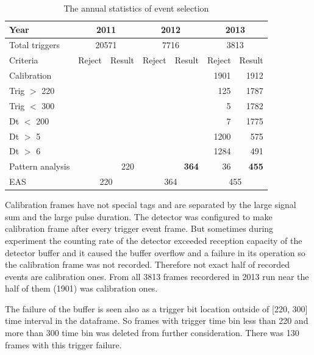 \documentclass[final,5p,times,twocolumn]{elsarticle}
\begin{document}
\begin{table}[bth]
    \centering
    \caption{The annual statistics of event selection}
    \label{tab:rejection}
    \vspace{1pc}
    \begin{tabular}{|l||r|r||r|r||r|r|}
    \hline
    Year & \multicolumn{2}{|c||}{2011} & \multicolumn{2}{|c||}{2012} & \multicolumn{2}{|c|}{2013} \\
    \hline
    Total triggers & \multicolumn{2}{|c||}{20571} & \multicolumn{2}{|c||}{7716} & \multicolumn{2}{|c|}{3813}\\
    \hline
    \hline
    Criteria & Reject & Result & Reject & Result & Reject & Result\\ 
    \hline 
    Calibration   &&&& & 1901 & 1912\\
    Trig $>$ 220  &&&& &  125 & 1787\\
    Trig $<$ 300  &&&& &    5 & 1782\\
    Dt   $<$ 200  &&&& &    7 & 1775\\
    Dt   $>$  5   &&&& & 1200 &  575\\
    Dt   $>$  6   &&&& & 1284 &  491\\
    Pattern analysis & & 220 && {\bf 364} & 36 &  {\bf 455}\\
    \hline
    \hline
    EAS         & \multicolumn{2}{|c||}{220} & \multicolumn{2}{|c||}{364} & \multicolumn{2}{|c|}{455}\\
    \hline
    \end{tabular}
\end{table}


Calibration frames have not special tags and are separated by the large signal sum and the large pulse duration. The detector was configured to make calibration frame after every trigger event frame. But sometimes during experiment the counting rate of the detector exceeded reception capacity of the detector buffer and it caused the buffer overflow and a failure in its operation so the calibration frame was not recorded. Therefore not exact half of recorded events are calibration ones.
From all 3813 frames recordered in 2013 run near the half of them (1901) was calibration ones. 

The failure of the buffer is seen also as a trigger bit location outside of [220, 300] time interval in the dataframe. So frames with trigger time bin less than 220 and more than 300 time bin was deleted from further consideration. There was 130 frames with this trigger failure.
\end{document}
